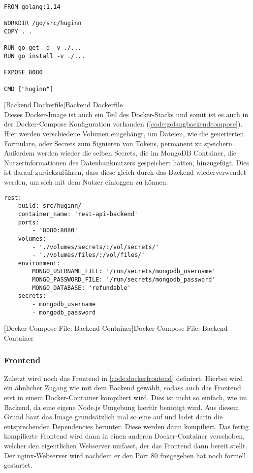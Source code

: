 \begin{verbatim}
FROM golang:1.14
	
WORKDIR /go/src/huginn
COPY . .
	
RUN go get -d -v ./...
RUN go install -v ./...
	
EXPOSE 8080
	
CMD ["huginn"]
\end{verbatim}
[Backend Dockerfile]{Backend Dockerfile}
\label{code:backgodocker}
~\\
Dieses Docker-Image ist auch ein Teil des Docker-Stacks und somit ist es auch in der Docker-Compose Konfiguration vorhanden (\autoref{code:golangbackendcompose}). Hier werden verschiedene Volumen eingehängt, um Dateien, wie die generierten Formulare, oder Secrets zum Signieren von Tokens, permanent zu speichern. Außerdem werden wieder die selben Secrets, die im MongoDB Container, die Nutzerinformationen des Datenbanknutzers gespeichert hatten, hinzugefügt. \cite{secretmongo} Dies ist darauf zurückzuführen, dass diese gleich durch das Backend wiederverwendet werden, um sich mit dem Nutzer einloggen zu können.

\begin{verbatim}
rest:
	build: src/huginn/
	container_name: 'rest-api-backend'
	ports:
		- '8080:8080'
	volumes:
		- './volumes/secrets/:/vol/secrets/'
		- './volumes/files/:/vol/files/'
	environment:
		MONGO_USERNAME_FILE: '/run/secrets/mongodb_username'
		MONGO_PASSWORD_FILE: '/run/secrets/mongodb_password'
		MONGO_DATABASE: 'refundable'
	secrets:
		- mongodb_username
		- mongodb_password
\end{verbatim}
[Docker-Compose File: Backend-Container]{Docker-Compose File: Backend-Container}
\label{code:golangbackendcompose}

\newpage

\subsubsection{Frontend}

Zuletzt wird noch das Frontend in \autoref{code:dockerfrontend} definiert. Hierbei wird ein ähnlicher Zugang wie mit dem Backend gewählt, sodass auch das Frontend erst in einem Docker-Container kompiliert wird. Dies ist nicht so einfach, wie im Backend, da eine eigene Node.js Umgebung hierfür benötigt wird. Aus diesem Grund baut das Image grundsätzlich mal so eine auf und ladet darin die entsprechenden Dependencies herunter. Diese werden dann kompiliert. Das fertig kompilierte Frontend wird dann in einen anderen Docker-Container verschoben, welcher den eigentlichen Webserver umfasst, der das Frontend dann bereit stellt. Der nginx-Webserver wird nachdem er den Port 80 freigegeben hat noch formell gestartet.

